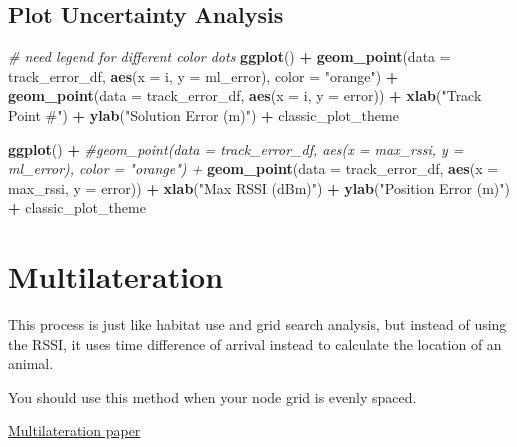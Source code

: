 \documentclass[
]{book}
\newenvironment{Shaded}{\begin{snugshade}}{\end{snugshade}}
\newcommand{\AttributeTok}[1]{\textcolor[rgb]{0.13,0.29,0.53}{#1}}
\newcommand{\CommentTok}[1]{\textcolor[rgb]{0.56,0.35,0.01}{\textit{#1}}}
\newcommand{\FunctionTok}[1]{\textcolor[rgb]{0.13,0.29,0.53}{\textbf{#1}}}
\newcommand{\NormalTok}[1]{#1}
\newcommand{\SpecialCharTok}[1]{\textcolor[rgb]{0.81,0.36,0.00}{\textbf{#1}}}
\newcommand{\StringTok}[1]{\textcolor[rgb]{0.31,0.60,0.02}{#1}}
\begin{document}
\section{Plot Uncertainty Analysis}\label{plot-uncertainty-analysis}

\begin{Shaded}
\begin{Highlighting}[]
\CommentTok{\# need legend for different color dots}
\FunctionTok{ggplot}\NormalTok{() }\SpecialCharTok{+}
  \FunctionTok{geom\_point}\NormalTok{(}\AttributeTok{data =}\NormalTok{ track\_error\_df, }\FunctionTok{aes}\NormalTok{(}\AttributeTok{x =}\NormalTok{ i, }\AttributeTok{y =}\NormalTok{ ml\_error), }\AttributeTok{color =} \StringTok{"orange"}\NormalTok{) }\SpecialCharTok{+}
  \FunctionTok{geom\_point}\NormalTok{(}\AttributeTok{data =}\NormalTok{ track\_error\_df, }\FunctionTok{aes}\NormalTok{(}\AttributeTok{x =}\NormalTok{ i, }\AttributeTok{y =}\NormalTok{ error)) }\SpecialCharTok{+}
  \FunctionTok{xlab}\NormalTok{(}\StringTok{"Track Point \#"}\NormalTok{) }\SpecialCharTok{+}
  \FunctionTok{ylab}\NormalTok{(}\StringTok{"Solution Error (m)"}\NormalTok{) }\SpecialCharTok{+}
\NormalTok{  classic\_plot\_theme}

\FunctionTok{ggplot}\NormalTok{() }\SpecialCharTok{+}
  \CommentTok{\#geom\_point(data = track\_error\_df, aes(x = max\_rssi, y = ml\_error), color = "orange") +}
  \FunctionTok{geom\_point}\NormalTok{(}\AttributeTok{data =}\NormalTok{ track\_error\_df, }\FunctionTok{aes}\NormalTok{(}\AttributeTok{x =}\NormalTok{ max\_rssi, }\AttributeTok{y =}\NormalTok{ error)) }\SpecialCharTok{+}
  \FunctionTok{xlab}\NormalTok{(}\StringTok{"Max RSSI (dBm)"}\NormalTok{) }\SpecialCharTok{+}
  \FunctionTok{ylab}\NormalTok{(}\StringTok{"Position Error (m)"}\NormalTok{) }\SpecialCharTok{+}
\NormalTok{  classic\_plot\_theme}
\end{Highlighting}
\end{Shaded}

\chapter{Multilateration}\label{multilateration}

This process is just like habitat use and grid search analysis, but instead of using the RSSI, it uses time difference of arrival instead to calculate the location of an animal.

You should use this method when your node grid is evenly spaced.

\href{https://pubmed.ncbi.nlm.nih.gov/35169450/}{Multilateration paper}
\end{document}
